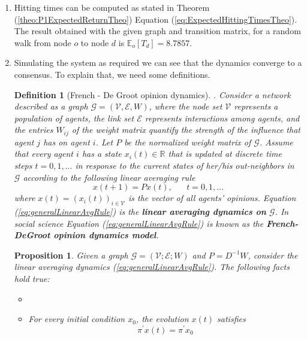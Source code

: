 \documentclass[
	12pt, %
]{fphw}
\newtheorem{proposition}{Proposition}
\newtheorem{definition}{Definition}
\begin{document}
\begin{enumerate}[(a\normalfont)]
    \item Hitting times can be computed as stated in Theorem (\ref{theo:P1ExpectedReturnTheo}) Equation (\ref{eq:ExpectedHittingTimesTheo}). The result obtained with the given graph and transition matrix, for a random walk from node $o$ to node $d$ is $\mathds{E}_{o}[T_d] =\mathbf{8.7857}$.
    
    \item Simulating the system as required we can see that the dynamics converge to a consensus. To explain that, we need some definitions. 
    \begin{definition}[French - De Groot opinion dynamics].\newline
        Consider a network described as a graph $\mathcal{G} = (\mathcal{V}, \mathcal{E}, W)$, where the node set $\mathcal{V}$ represents a population of agents, the link set $\mathcal{E}$ represents interactions among agents, and the entries $W_{ij}$ of the weight matrix quantify the strength of the influence that agent $j$ has on agent $i$. Let $P$ be the normalized weight matrix of $\mathcal{G}$. Assume that every agent $i$ has a state $x_i(t) \in \mathds{R}$ that is updated at discrete time steps $t = 0,1,...$ in response to the current states of her/his out-neighbors in $\mathcal{G}$ according to the following linear averaging rule
        \begin{equation}\label{eq:generalLinearAvgRule}
            x(t + 1) = Px(t), \hspace{20pt} t = 0,1,...
        \end{equation}
        where $x(t) = (x_i(t))_{i \in \mathcal{V}}$ is the vector of all agents' opinions. Equation (\ref{eq:generalLinearAvgRule}) is the \textbf{linear averaging dynamics on} $\mathbf{\mathcal{G}}$.
        In social science Equation (\ref{eq:generalLinearAvgRule}) is known as the \textbf{French-DeGroot opinion dynamics model}.
    \end{definition}
    \begin{proposition}
    Given a graph $\mathcal{G} = (\mathcal{V}; \mathcal{E};W)$ and $P = D^{-1}W$, consider the linear averaging dynamics (\ref{eq:generalLinearAvgRule}). The following facts hold true:
    \begin{itemize}
        \item[...]
        \item[(ii)] For every initial condition $x_0$, the evolution $x(t)$ satisfies
        \begin{equation}\label{eq:generalEvolutionWithPi}
            \pi^{'}x(t) = \pi^{'}x_0

\end{equation}
\end{itemize}
\end{proposition}
\end{enumerate}
\end{document}
